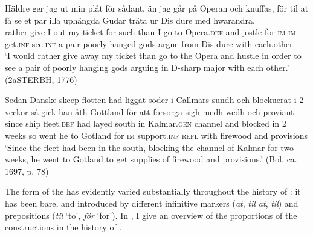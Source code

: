 \documentclass[output=paper]{langscibook}
\begin{document}
\ex  \label{ex:kalm:11c}
\gll Häldre ger jag ut min plåt för sådant, än jag går på Operan och knuffas, för til at få se et par illa uphängda Gudar träta ur Dis dure med hwarandra.\\
rather give I out my ticket for such than I go to Opera.\textsc{def} and jostle for \textsc{im} \textsc{im} get.\textsc{inf} see.\textsc{inf} a pair poorly hanged gods argue from Dis dure with each.other\\
\glt ‘I would rather give away my ticket than go to the Opera and hustle in order to see a pair of poorly hanging gods arguing in D-sharp major with each other.’ (2aSTERBH, 1776)

\ex \label{ex:kalm:11d}
\gll Sedan Danske skeep flotten had liggat söder i Callmars sundh och blockuerat i 2 veckor så gick han åth Gottland för att forsorga sigh medh wedh och proviant.\\
since  ship fleet.\textsc{def} had layed south in Kalmar.\textsc{gen} channel and blocked in 2 weeks so went he to Gotland for \textsc{im} support.\textsc{inf} \textsc{refl} with firewood and provisions\\ 
\glt ‘Since the  fleet had been in the south, blocking the channel of Kalmar for two weeks, he went to Gotland to get supplies of firewood and provisions.’ (Bol, ca. 1697, p. 78)
\z 
\z 


\begin{sloppypar}
The form of the  has evidently varied substantially throughout the history of : it has been bare, and introduced by different infinitive markers (\textit{at}, \textit{til at}, \textit{til}) and prepositions (\textit{til} ‘to’\textit{, för} ‘for’). In , I give an overview of the proportions of the  constructions in the history of . 
\end{sloppypar}
\end{document}
